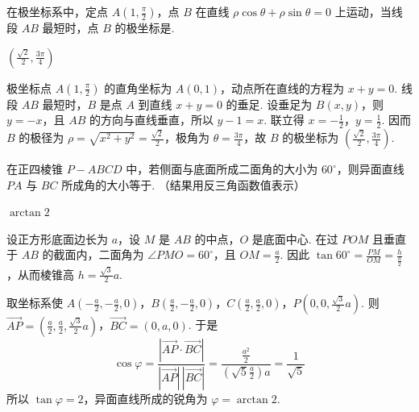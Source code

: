 \begin{problem}
在极坐标系中，定点 \(A\left(1, \frac{\pi}{2}\right)\)，点 \(B\) 在直线 \(\rho \cos \theta + \rho \sin \theta = 0\) 上运动，当线段 \(AB\) 最短时，点 \(B\) 的极坐标是\fillinblank{}.
\end{problem}

\begin{answer}
\(\left(\frac{\sqrt{2}}{2}, \frac{3\pi}{4}\right)\)
\end{answer}

\begin{solution}
极坐标点 \(A\left(1,\frac{\pi}{2}\right)\) 的直角坐标为 \(A(0,1)\)，动点所在直线的方程为 \(x+y=0\). 线段 \(AB\) 最短时，\(B\) 是点 \(A\) 到直线 \(x+y=0\) 的垂足. 设垂足为 \(B(x,y)\)，则 \(y=-x\)，且 \(AB\) 的方向与直线垂直，所以 \(y-1=x\). 联立得 \(x=-\frac{1}{2}\)，\(y=\frac{1}{2}\). 因而 \(B\) 的极径为 \(\rho=\sqrt{x^{2}+y^{2}}=\frac{\sqrt{2}}{2}\)，极角为 \(\theta=\frac{3\pi}{4}\)，故 \(B\) 的极坐标为 \(\left(\frac{\sqrt{2}}{2},\frac{3\pi}{4}\right)\).
\end{solution}

\begin{problem}
在正四棱锥 \(P - ABCD\) 中，若侧面与底面所成二面角的大小为 \(60^{\circ}\)，则异面直线 \(PA\) 与 \(BC\) 所成角的大小等于\fillinblank{}. （结果用反三角函数值表示）
\end{problem}

\begin{answer}
\(\arctan 2\)
\end{answer}

\begin{solution}
设正方形底面边长为 \(a\)，设 \(M\) 是 \(AB\) 的中点，\(O\) 是底面中心. 在过 \(POM\) 且垂直于 \(AB\) 的截面内，二面角为 \(\angle PMO=60^{\circ}\)，且 \(OM=\frac{a}{2}\). 因此 \(\tan60^{\circ}=\frac{PM}{OM}=\frac{h}{\frac{a}{2}}\)，从而棱锥高 \(h=\frac{\sqrt{3}}{2}a\).

取坐标系使 \(A\left(-\frac{a}{2},-\frac{a}{2},0\right)\)，\(B\left(\frac{a}{2},-\frac{a}{2},0\right)\)，\(C\left(\frac{a}{2},\frac{a}{2},0\right)\)，\(P\left(0,0,\frac{\sqrt{3}}{2}a\right)\). 则 \(\overrightarrow{AP}=\left(\frac{a}{2},\frac{a}{2},\frac{\sqrt{3}}{2}a\right)\)，\(\overrightarrow{BC}=(0,a,0)\). 于是
\[
\cos\varphi=\frac{|\overrightarrow{AP}\cdot\overrightarrow{BC}|}{|\overrightarrow{AP}|\,|\overrightarrow{BC}|}=\frac{\frac{a^{2}}{2}}{(\sqrt{5}\frac{a}{2})a}=\frac{1}{\sqrt{5}}
\]
所以 \(\tan\varphi=2\)，异面直线所成的锐角为 \(\varphi=\arctan2\).
\end{solution}

